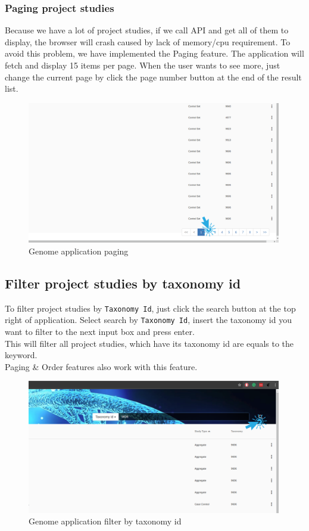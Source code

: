 \documentclass[a4paper,12pt]{article}
\begin{document}
\subsubsection{Paging project studies}
Because we have a lot of project studies, if we call API and get all of them to display, the browser will crash caused by lack of memory/cpu requirement. To avoid this problem, we have implemented the Paging feature. The application will  fetch and display 15 items per page. When the user wants to see more, just change the current page by click the page number button at the end of the result list.

\begin{figure}[H]
\centering
\includegraphics[width=0.99\textwidth]{images/genome-paging}
\caption{Genome application paging}
\end{figure}

\subsection{Filter project studies by taxonomy id}
To filter project studies by \texttt{Taxonomy Id}, just click the search button at the top right of application. Select search by \texttt{Taxonomy Id}, insert the taxonomy id you want to filter to the next input box and press enter.\\
This will filter all project studies, which have its taxonomy id are equals to the keyword.\\
Paging \& Order features also work with this feature.

\begin{figure}[H]
\centering
\includegraphics[width=0.99\textwidth]{images/genome-filter-taxonomy}
\caption{Genome application filter by taxonomy id}
\end{figure}
\end{document}
